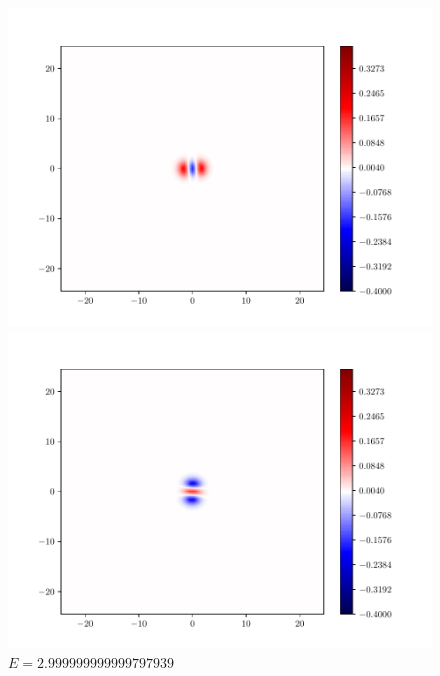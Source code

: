 \documentclass{article}
\begin{document}
\begin{enumerate}[1.]
\begin{enumerate}[(A)]
\begin{enumerate}[(i)]
\begin{figure}[H]
        \begin{minipage}{0.3\linewidth}
          \centering
          \includegraphics[width=\linewidth]{functions-3.pdf}
          \caption*{$E = 2.999999999999794387$}
        \end{minipage}
        \begin{minipage}{0.3\linewidth}
          \centering
          \includegraphics[width=\linewidth]{functions-4.pdf}
          \caption*{$E = 2.999999999999797939$}
        \end{minipage}
        \begin{minipage}{0.3\linewidth}
          \centering

\end{minipage}
\end{figure}
\end{enumerate}
\end{enumerate}
\end{enumerate}
\end{document}
